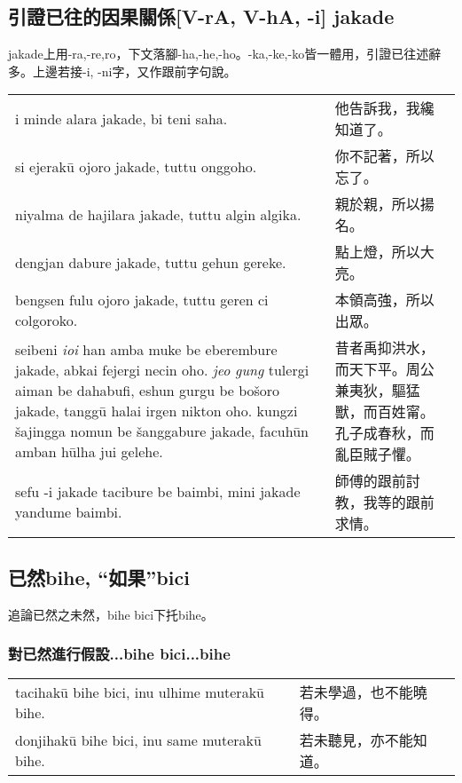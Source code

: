 \documentclass{article}
\begin{document}
\subsection{引證已往的因果關係[V-rA, V-hA, -i] jakade}
\noindent jakade上用-ra,-re,ro，下文落腳-ha,-he,-ho。-ka,-ke,-ko皆一體用，引證已往述辭多。上邊若接-i, -ni字，又作跟前字句說。
\begin{center}
    \begin{tabularx}{\textwidth}{XX}
     i minde alara jakade, bi teni saha. &他告訴我，我纔知道了。\\
     si ejerak\={u} ojoro jakade, tuttu onggoho.& 你不記著，所以忘了。\\
     niyalma de hajilara jakade, tuttu algin algika. &親於親，所以揚名。\\
     dengjan dabure jakade, tuttu gehun gereke. &點上燈，所以大亮。\\
     bengsen fulu ojoro jakade, tuttu geren ci colgoroko. &本領高強，所以出眾。\\
     seibeni \emph{ioi} han amba muke be eberembure jakade, abkai fejergi necin oho. \emph{jeo gung} tulergi aiman be dahabufi, eshun gurgu be bo\v{s}oro jakade, tangg\={u} halai irgen nikton oho. kungzi \v{s}ajingga nomun be \v{s}anggabure jakade, facuh\={u}n amban h\={u}lha jui gelehe. &昔者禹抑洪水，而天下平。周公兼夷狄，驅猛獸，而百姓甯。孔子成春秋，而亂臣賊子懼。\\
     sefu -i jakade tacibure be baimbi, mini jakade yandume baimbi. &師傅的跟前討教，我等的跟前求情。
    \end{tabularx}
\end{center}

\subsection{已然bihe, “如果”bici}
\noindent 追論已然之未然，bihe bici下托bihe。
\subsubsection{對已然進行假設...bihe bici...bihe}
\begin{center}
    \begin{tabularx}{\textwidth}{XX}
     tacihak\={u} bihe bici, inu ulhime muterak\={u} bihe. &若未學過，也不能曉得。\\
     donjihak\={u} bihe bici, inu same muterak\={u} bihe. &若未聽見，亦不能知道。
    \end{tabularx}
\end{center}
\end{document}
